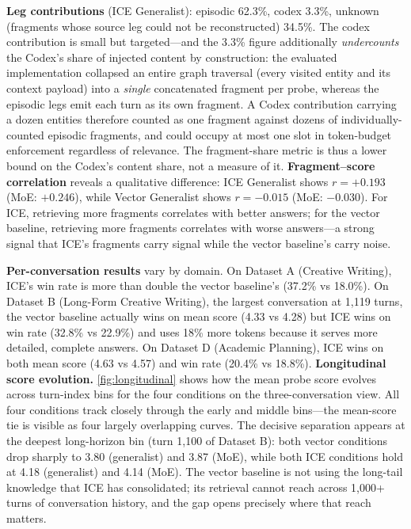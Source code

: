 \documentclass[10pt]{article}
\begin{document}
\textbf{Leg contributions} (ICE Generalist): episodic 62.3\%, codex 3.3\%, unknown (fragments whose source leg could not be reconstructed) 34.5\%. The codex contribution is small but targeted---and the 3.3\% figure additionally \emph{undercounts} the Codex's share of injected content by construction: the evaluated implementation collapsed an entire graph traversal (every visited entity and its context payload) into a \emph{single} concatenated fragment per probe, whereas the episodic legs emit each turn as its own fragment. A Codex contribution carrying a dozen entities therefore counted as one fragment against dozens of individually-counted episodic fragments, and could occupy at most one slot in token-budget enforcement regardless of relevance. The fragment-share metric is thus a lower bound on the Codex's content share, not a measure of it. \textbf{Fragment--score correlation} reveals a qualitative difference: ICE Generalist shows $r = +0.193$ (MoE: $+0.246$), while Vector Generalist shows $r = -0.015$ (MoE: $-0.030$). For ICE, retrieving more fragments correlates with better answers; for the vector baseline, retrieving more fragments correlates with worse answers---a strong signal that ICE's fragments carry signal while the vector baseline's carry noise.

\textbf{Per-conversation results} vary by domain. On Dataset A (Creative Writing), ICE's win rate is more than double the vector baseline's (37.2\% vs 18.0\%). On Dataset B (Long-Form Creative Writing), the largest conversation at 1{,}119 turns, the vector baseline actually wins on mean score (4.33 vs 4.28) but ICE wins on win rate (32.8\% vs 22.9\%) and uses 18\% more tokens because it serves more detailed, complete answers. On Dataset D (Academic Planning), ICE wins on both mean score (4.63 vs 4.57) and win rate (20.4\% vs 18.8\%). \textbf{Longitudinal score evolution.} \cref{fig:longitudinal} shows how the mean probe score evolves across turn-index bins for the four conditions on the three-conversation view. All four conditions track closely through the early and middle bins---the mean-score tie is visible as four largely overlapping curves. The decisive separation appears at the deepest long-horizon bin (turn 1{,}100 of Dataset B): both vector conditions drop sharply to 3.80 (generalist) and 3.87 (MoE), while both ICE conditions hold at 4.18 (generalist) and 4.14 (MoE). The vector baseline is not using the long-tail knowledge that ICE has consolidated; its retrieval cannot reach across 1{,}000+ turns of conversation history, and the gap opens precisely where that reach matters.
\end{document}
